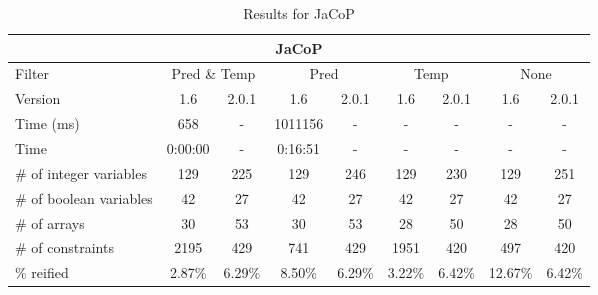 \documentclass{standalone}
\begin{document}
\begin{table}[H]
\footnotesize
\centering
\begin{tabular}{lc|c|c|c|c|c|c|c}
\multicolumn{9}{c}{JaCoP} \\ 
\hline\hline Filter & \multicolumn{2}{c|}{Pred \& Temp} &\multicolumn{2}{c|}{Pred}  & \multicolumn{2}{c|}{Temp} & \multicolumn{2}{c}{None} \\ 
\hline Version & 1.6 & 2.0.1 & 1.6 & 2.0.1 & 1.6 & 2.0.1 & 1.6 & 2.0.1 \\ 
Time (ms)               & 658 & - & 1011156 & - & - & - & - & - \\
Time                    & 0:00:00 & - & 0:16:51 & - & - & - & - & - \\ 
\# of integer variables & 129 & 225 & 129 & 246 & 129 & 230 & 129 & 251 \\ 
\# of boolean variables & 42 & 27 & 42 & 27 & 42 & 27 & 42 & 27 \\ 
\# of arrays            & 30 & 53 & 30 & 53 & 28 & 50 & 28 & 50 \\ 
\# of constraints       & 2195 & 429 & 741 & 429 & 1951 & 420 & 497 & 420 \\ 
\% reified               & 2.87\% & 6.29\% & 8.50\% & 6.29\% & 3.22\% & 6.42\% & 12.67\% & 6.42\% \\ 
\end{tabular}
\caption{Results for JaCoP}\label{tab:res_jacop}
\end{table}
\end{document}
